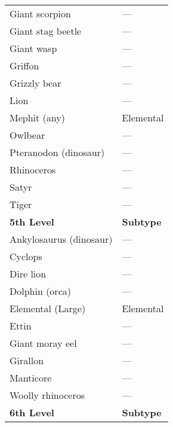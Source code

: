 \begin{xtabular}{ll}
Giant scorpion                                & ---                \\
Giant stag beetle                             & ---                \\
Giant wasp                                    & ---                \\
Griffon                                       & ---                \\
Grizzly bear                                  & ---                \\
Lion                                          & ---                \\
Mephit (any)                                  & Elemental        \\
Owlbear                                       & ---                \\
Pteranodon (dinosaur)                         & ---                \\
Rhinoceros                                    & ---                \\
Satyr                                         & ---                \\
Tiger                                         & ---                \\
\textbf{5th Level}                            & \textbf{Subtype} \\
Ankylosaurus (dinosaur)                       & ---                \\
Cyclops                                       & ---                \\
Dire lion                                     & ---                \\
Dolphin (orca)                                & ---                \\
Elemental (Large)                             & Elemental        \\
Ettin                                         & ---                \\
Giant moray eel                               & ---                \\
Girallon                                      & ---                \\
Manticore                                     & ---                \\
Woolly rhinoceros                             & ---                \\
\textbf{6th Level}                            & \textbf{Subtype} \\

\end{xtabular}
